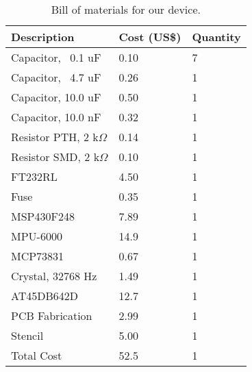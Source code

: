 \begin{table}[h]
\centering
\begin{tabular}{@{}lll@{}}
\toprule
Description                      & Cost (US\$)                      & Quantity               \\ \midrule
Capacitor, ~0.1 uF                 & 0.10                       & 7                      \\
Capacitor, ~4.7 uF                 & 0.26                      & 1                      \\
Capacitor, 10.0 uF                  & 0.50                       & 1                      \\
Capacitor, 10.0 nF                  & 0.32                      & 1                      \\
Resistor PTH, 2 k$\Omega$                 & 0.14                      & 1                      \\
Resistor SMD, 2 k$\Omega$                 & 0.10                       & 1                      \\
FT232RL                          & 4.50                       & 1                      \\
Fuse	                         & 0.35                      & 1                      \\
MSP430F248                       & 7.89                      & 1                      \\
MPU-6000                         & 14.9                      & 1                      \\
MCP73831                         & 0.67                      & 1                      \\
Crystal, 32768 Hz                & 1.49                      & 1                      \\
AT45DB642D                       & 12.7                      & 1                      \\
PCB Fabrication                  & 2.99                      & 1                      \\
Stencil                          & 5.00                         & 1                      \\ \midrule
Total Cost & 52.5 &	1\\ \bottomrule
\end{tabular}
\caption{Bill of materials for our device.}
\label{BomTable}
\end{table}